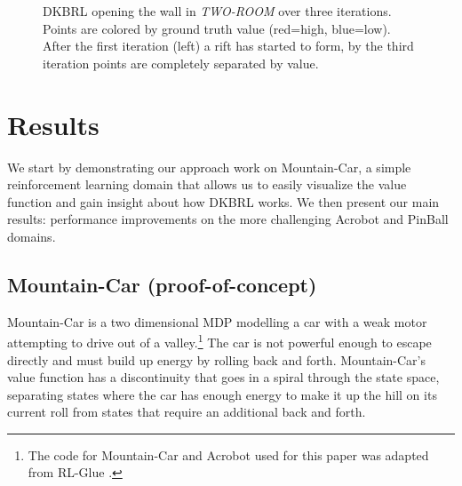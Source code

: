 \documentclass{article} %
\begin{document}
\begin{figure}[!htb]
  \endminipage
  \label{eyec}
\caption
{DKBRL opening the wall in \textit{TWO-ROOM} over three iterations.
Points are colored by ground truth value (red=high, blue=low).
After the first iteration (left) a rift has started to form, by the
third iteration points are completely separated by value.}
\end{figure}

\section{Results}

We start by demonstrating our approach work on Mountain-Car, a simple
reinforcement learning domain that allows us to easily
visualize the value function and gain insight about how DKBRL works.
We then present our main results:
performance improvements on the more challenging Acrobot and PinBall domains.

%
%

\subsection{Mountain-Car (proof-of-concept)}
Mountain-Car is a two dimensional MDP \cite{rlai}
modelling a car with a weak motor attempting to drive out of a valley.\footnote{
The code for Mountain-Car and Acrobot used for this paper was adapted from
RL-Glue \cite{rlglue}.}
The car is not powerful enough to escape directly and must build up
energy by rolling back and forth.
Mountain-Car's value function has a discontinuity that goes in a spiral through
the state space, separating states where the car has enough energy to make it
up the hill on its current roll from states that require an additional back
and forth.
\end{document}
